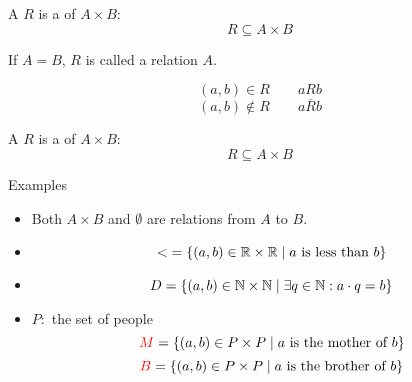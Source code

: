 
\begin{frame}{}
  \begin{definition}[关系 (Relations)]
    A  $R$ 
    is a  of $A \times B$:
    \[
      {R \subseteq A \times B}
    \]
  \end{definition}

  \pause
  \vspace{0.30cm}
  \begin{center}
    If $A = B$, $R$ is called a relation  $A$.
  \end{center}

  \pause
  \vspace{0.50cm}
  \begin{definition}[Notations]
    \[
      (a, b) \in R \qquad a R b
    \]
    \[
      (a, b) \notin R \qquad a \overline{R} b
    \]
  \end{definition}
\end{frame}

\begin{frame}{}
  \begin{definition}[Relations]
    A  $R$ 
    is a  of $A \times B$:
    \[
      {R \subseteq A \times B}
    \]
  \end{definition}

  \begin{exampleblock}{Examples}
    \pause
    \begin{itemize}[<+->]
      \item Both $A \times B$ and $\emptyset$ are relations from $A$ to $B$.
      \item
        \[
          <\; = \{(a, b) \in \mathbb{R} \times \mathbb{R} \mid a \text{ is less than } b\}
        \]
      \item
        \[
          D = \{(a, b) \in \mathbb{N} \times \mathbb{N} \mid \exists q \in \mathbb{N}: a \cdot q = b\}
        \]
      \item $P:$ the set of people
        \[
          \textcolor{red}{M} = \{(a, b) \in P \times P \mid a \text{ is the mother of } b\}
        \]
        \[
          \textcolor{red}{B} = \{(a, b) \in P \times P \mid a \text{ is the brother of } b\}
        \]
    \end{itemize}
  \end{exampleblock}
\end{frame}

